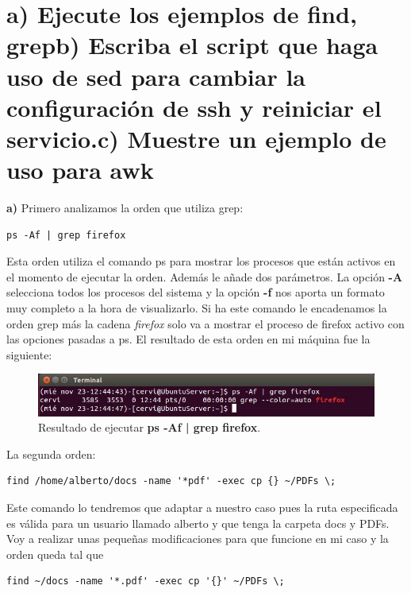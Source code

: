 \section{a) Ejecute los ejemplos de find, grep\newline b) Escriba el script que haga uso de sed para cambiar la configuración de ssh y reiniciar el servicio.\newline c) Muestre un ejemplo de uso para awk}

\textbf{a)} Primero analizamos la orden que utiliza grep\cite{grep}: \begin{verbatim}ps -Af | grep firefox\end{verbatim} Esta orden utiliza el comando ps\cite{ps} para mostrar los procesos que están activos en el momento de ejecutar la orden. Además le añade dos parámetros. La opción \textbf{-A} selecciona todos los procesos del sistema y la opción \textbf{-f} nos aporta un formato muy completo a la hora de visualizarlo. Si ha este comando le encadenamos la orden grep más la cadena \textit{firefox} solo va a mostrar el proceso de firefox activo con las opciones pasadas a ps. El resultado de esta orden en mi máquina fue la siguiente:
\begin{figure}[H]
	\centering
	\includegraphics[scale=0.75]{ps-Af.jpg}
	\caption{Resultado de ejecutar \textbf{ps -Af | grep firefox}. \label{fig:figura22}}
\end{figure}

La segunda orden:  \begin{verbatim}find /home/alberto/docs -name '*pdf' -exec cp {} ~/PDFs \;\end{verbatim} Este comando lo tendremos que adaptar a nuestro caso pues la ruta especificada es válida para un usuario llamado alberto y que tenga la carpeta docs y PDFs. Voy a realizar unas pequeñas modificaciones para que funcione en mi caso y la orden queda tal que
\begin{verbatim}find ~/docs -name '*.pdf' -exec cp '{}' ~/PDFs \;\end{verbatim}

